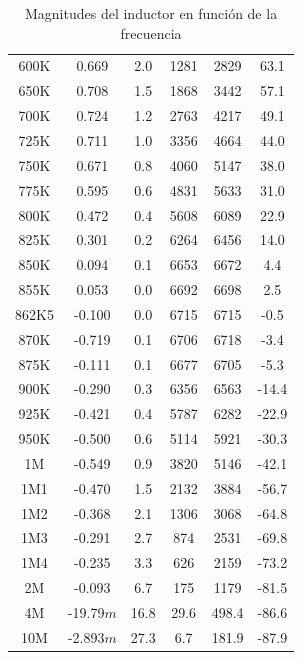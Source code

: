 \begin{center}
\begin{table}[H]
{\begin{tabular}{ c c c c c c }
				600K  & 0.669        & 2.0    & 1281 		& 2829  & 63.1   \\
				650K  & 0.708        & 1.5 		 & 1868 	& 3442  & 57.1    \\
				700K  & 0.724       & 1.2  		& 2763 		& 4217  & 49.1    \\
				725K  & 0.711        & 1.0  	  & 3356	 & 4664  & 44.0    \\
				750K  & 0.671       & 0.8 		 & 4060 	& 5147  & 38.0    \\
				775K  & 0.595       & 0.6 		 & 4831 	& 5633  & 31.0       \\
				800K  & 0.472       & 0.4 		 & 5608 	& 6089  & 22.9       \\
				825K  & 0.301       & 0.2  		& 6264 		& 6456  & 14.0       \\
				850K  & 0.094        & 0.1  	& 6653		& 6672  & 4.4        \\
				855K  & 0.053       & 0.0  		  & 6692	 & 6698  & 2.5        \\
				862K5 & -0.100         & 0.0    & 6715 		& 6715  & -0.5       \\
				870K  & -0.719       & 0.1 		 & 6706 	& 6718  & -3.4        \\
				875K  & -0.111      & 0.1  		& 6677 		& 6705  & -5.3       \\
				900K  & -0.290      & 0.3  		& 6356 		& 6563  & -14.4      \\
				925K  & -0.421      & 0.4 		 & 5787		 & 6282  & -22.9      \\
				950K  & -0.500         & 0.6  	& 5114 		& 5921  & -30.3       \\
				1M    & -0.549      & 0.9  		& 3820		 & 5146  & -42.1      \\
				1M1  & -0.470      & 1.5  		& 2132		 & 3884  & -56.7      \\
				1M2  & -0.368      & 2.1  		& 1306 		& 3068  & -64.8      \\
				1M3   & -0.291      & 2.7  		& 874  		& 2531  & -69.8      \\
				1M4  & -0.235      & 3.3 		 & 626  	& 2159  & -73.2     \\
				2M    & -0.093      & 6.7 		 & 175 		 & 1179  & -81.5       \\
				4M    & -19.79$m$ & 16.8 		& 29.6		 & 498.4 & -86.6     \\
				10M   & -2.893$m$ & 27.3 		& 6.7  		& 181.9 & -87.9     \\
            \hline 
        \end{tabular}
        }
        \caption{Magnitudes del inductor en función de la frecuencia}
        \label{table:Rta_en_frecuencia_inductor}
    \end{table}
\end{center}
